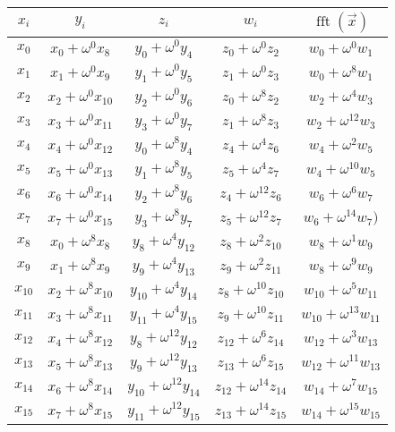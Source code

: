 \documentclass[12 pt]{amsart}
\newcommand\T{\rule{0pt}{-1.0ex}}       %
\newcommand\B{\rule[0.5ex]{0pt}{0pt}} %
\newcommand{\om}[2] {\omega_{#1}^{#2}}
\begin{document}
\begin{center}
\begin{tabular}{c|c|c|c|c}
$x_i$ & $y_i$ & $z_i$ & $w_i$ & $\operatorname{fft}(\vec{x})$\\
\hline
 $x_{0}$ &  $x_{0}+\om{}{0}x_{8}$  & $y_{0}+\om{}{0}y_{4}$    & $z_{0}+\om{}{0}z_{2}$    & $w_{0}+\om{}{0}w_{1}$\T\B\\
 $x_{1}$ &  $x_{1}+\om{}{0}x_{9}$  & $y_{1}+\om{}{0}y_{5}$    & $z_{1}+\om{}{0}z_{3}$    & $w_{0}+\om{}{8}w_{1}$\T\B\\
 $x_{2}$ &  $x_{2}+\om{}{0}x_{10}$ & $y_{2}+\om{}{0}y_{6}$    & $z_{0}+\om{}{8}z_{2}$    & $w_{2}+\om{}{4}w_{3}$\T\B\\
 $x_{3}$ &  $x_{3}+\om{}{0}x_{11}$ & $y_{3}+\om{}{0}y_{7}$    & $z_{1}+\om{}{8}z_{3}$    & $w_{2}+\om{}{12}w_{3}$\T\B\\
 $x_{4}$ &  $x_{4}+\om{}{0}x_{12}$ & $y_{0}+\om{}{8}y_{4}$    & $z_{4}+\om{}{4}z_{6}$    & $w_{4}+\om{}{2}w_{5}$\T\B\\
 $x_{5}$ &  $x_{5}+\om{}{0}x_{13}$ & $y_{1}+\om{}{8}y_{5}$    & $z_{5}+\om{}{4}z_{7}$    & $w_{4}+\om{}{10}w_{5}$\T\B\\
 $x_{6}$ &  $x_{6}+\om{}{0}x_{14}$ & $y_{2}+\om{}{8}y_{6}$    & $z_{4}+\om{}{12}z_{6}$   & $w_{6}+\om{}{6}w_{7}$\T\B\\
 $x_{7}$ &  $x_{7}+\om{}{0}x_{15}$ & $y_{3}+\om{}{8}y_{7}$    & $z_{5}+\om{}{12}z_{7}$   & $w_{6}+\om{}{14}w_{7})$\T\B\\
 $x_{8}$ &  $x_{0}+\om{}{8}x_{8}$  & $y_{8}+\om{}{4}y_{12}$   & $z_{8}+\om{}{2}z_{10}$   & $w_{8}+\om{}{1}w_{9}$\T\B\\
 $x_{9}$ &  $x_{1}+\om{}{8}x_{9}$  & $y_{9}+\om{}{4}y_{13}$   & $z_{9}+\om{}{2}z_{11}$   & $w_{8}+\om{}{9}w_{9}$\T\B\\
$x_{10}$ &  $x_{2}+\om{}{8}x_{10}$ & $y_{10}+\om{}{4}y_{14}$  & $z_{8}+\om{}{10}z_{10}$  & $w_{10}+\om{}{5}w_{11}$\T\B\\
$x_{11}$ &  $x_{3}+\om{}{8}x_{11}$ & $y_{11}+\om{}{4}y_{15}$  & $z_{9}+\om{}{10}z_{11}$  & $w_{10}+\om{}{13}w_{11}$\T\B\\
$x_{12}$ &  $x_{4}+\om{}{8}x_{12}$ & $y_{8}+\om{}{12}y_{12}$  & $z_{12}+\om{}{6}z_{14}$  & $w_{12}+\om{}{3}w_{13}$\T\B\\
$x_{13}$ &  $x_{5}+\om{}{8}x_{13}$ & $y_{9}+\om{}{12}y_{13}$  & $z_{13}+\om{}{6}z_{15}$  & $w_{12}+\om{}{11}w_{13}$\T\B\\
$x_{14}$ &  $x_{6}+\om{}{8}x_{14}$ & $y_{10}+\om{}{12}y_{14}$ & $z_{12}+\om{}{14}z_{14}$ & $w_{14}+\om{}{7}w_{15}$\T\B\\
$x_{15}$ &  $x_{7}+\om{}{8}x_{15}$ & $y_{11}+\om{}{12}y_{15}$ & $z_{13}+\om{}{14}z_{15}$ & $w_{14}+\om{}{15}w_{15}$\T\B\\
\end{tabular} 
\end{center}
\end{document}
